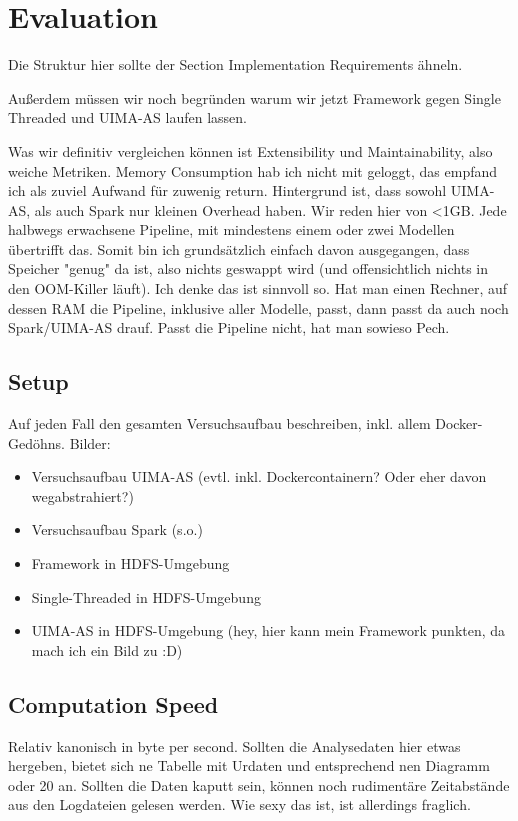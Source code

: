 \chapter{Evaluation}
\label{ch:evaluation}
Die Struktur hier sollte der Section Implementation Requirements ähneln.

Außerdem müssen wir noch begründen warum wir jetzt Framework gegen Single Threaded und UIMA-AS laufen lassen.

Was wir definitiv vergleichen können ist Extensibility und Maintainability, also weiche Metriken. Memory Consumption hab ich nicht mit geloggt, das empfand ich als zuviel Aufwand für zuwenig return. Hintergrund ist, dass sowohl UIMA-AS, als auch Spark nur kleinen Overhead haben. Wir reden hier von <1GB. Jede halbwegs erwachsene Pipeline, mit mindestens einem oder zwei Modellen übertrifft das. Somit bin ich grundsätzlich einfach davon ausgegangen, dass Speicher "genug" da ist, also nichts geswappt wird (und offensichtlich nichts in den OOM-Killer läuft). Ich denke das ist sinnvoll so. Hat man einen Rechner, auf dessen RAM die Pipeline, inklusive aller Modelle, passt, dann passt da auch noch Spark/UIMA-AS drauf. Passt die Pipeline nicht, hat man sowieso Pech.

\section{Setup}

Auf jeden Fall den gesamten Versuchsaufbau beschreiben, inkl. allem Docker-Gedöhns. 
Bilder:
\begin{itemize}
	\item Versuchsaufbau UIMA-AS (evtl. inkl. Dockercontainern? Oder eher davon wegabstrahiert?)
	\item Versuchsaufbau Spark (s.o.)
	\item Framework in HDFS-Umgebung
	\item Single-Threaded in HDFS-Umgebung
	\item UIMA-AS in HDFS-Umgebung (hey, hier kann mein Framework punkten, da mach ich ein Bild zu :D)
	
\end{itemize}

\section{Computation Speed}

Relativ kanonisch in byte per second. Sollten die Analysedaten hier etwas hergeben, bietet sich ne Tabelle mit Urdaten und entsprechend nen Diagramm oder 20 an. Sollten die Daten kaputt sein, können noch rudimentäre Zeitabstände aus den Logdateien gelesen werden. Wie sexy das ist, ist allerdings fraglich.

